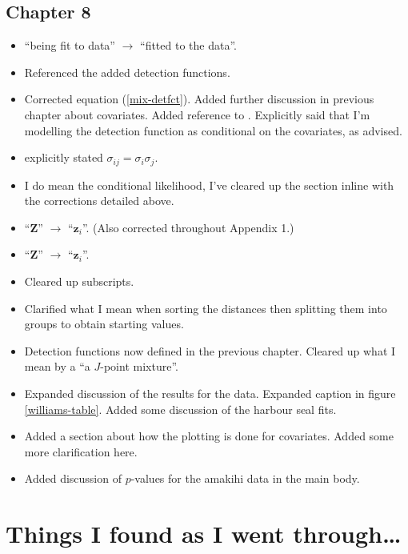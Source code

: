 \subsection{Chapter 8}
\begin{itemize}
\item {} ``being fit to data'' $\rightarrow$ ``fitted to the data''.
\item {} Referenced the added detection functions.
\item {} Corrected equation (\ref{mix-detfct}).  Added further discussion in previous chapter about covariates.  Added reference to \cite{covpaper}.  Explicitly said that I'm modelling the detection function as conditional on the covariates, as advised.
\item {} explicitly stated $\sigma_{ij}=\sigma_i\sigma_j$.
\item {} I do mean the conditional likelihood, I've cleared up the section inline with the corrections detailed above.
\item {} ``$\mathbf{Z}$'' $\rightarrow$ ``$\mathbf{z}_i$''. (Also corrected throughout Appendix 1.)
\item {} ``$\mathbf{Z}$'' $\rightarrow$ ``$\mathbf{z}_i$''.
\item {} Cleared up subscripts.
\item {} Clarified what I mean when sorting the distances then splitting them into groups to obtain starting values.
\item {} Detection functions now defined in the previous chapter.  Cleared up what I mean by a ``a $J$-point mixture''.
\item {} Expanded discussion of the results for the  data.  Expanded caption in figure \ref{williams-table}.  Added some discussion of the harbour seal fits.
\item {} Added a section about how the plotting is done for covariates.  Added some more clarification here.
\item {} Added discussion of $p$-values for the amakihi data in the main body.
\end{itemize}

\section{Things I found as I went through\dots}

